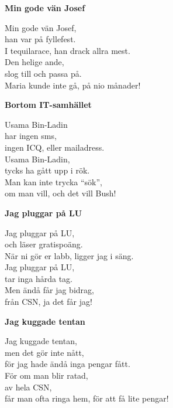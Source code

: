 \documentclass[10pt]{article}
\newenvironment{song}[2]{
	\textbf{#1}\\
	\emph{#2}\par
	\vspace{-1mm}
}{
	\vspace{2mm}
}
\begin{document}
\begin{multicols*}{2}
\vspace*{-0.2\baselineskip}
\begin{song}{Min gode vän Josef}{\vspace*{-1.2\baselineskip}}
	Min gode vän Josef,\\
	han var på fyllefest.\\
	I tequilarace, han drack allra mest.\\
	Den helige ande,\\
	slog till och passa på.\\
	Maria kunde inte gå, på nio månader!
\end{song}

\vspace*{-0.2\baselineskip}
\begin{song}{Bortom IT-samhället}{\vspace*{-1.2\baselineskip}}
	Usama Bin-Ladin\\
	har ingen sms,\\
	ingen ICQ, eller mailadress.\\
	Usama Bin-Ladin,\\
	tycks ha gått upp i rök.\\
	Man kan inte trycka ``sök'',\\
	om man vill, och det vill Bush!
\end{song}

\vspace*{-0.2\baselineskip}
\begin{song}{Jag pluggar på LU}{\vspace*{-1.2\baselineskip}}
	Jag pluggar på LU,\\
	och läser gratispoäng.\\
	När ni gör er labb, ligger jag i säng.\\
	Jag pluggar på LU,\\
	tar inga hårda tag.\\
	Men ändå får jag bidrag,\\
	från CSN, ja det får jag!
\end{song}

\vspace*{-0.2\baselineskip}
\begin{song}{Jag kuggade tentan}{\vspace*{-1.2\baselineskip}}
	Jag kuggade tentan,\\
	men det gör inte nått,\\
	för jag hade ändå inga pengar fått.\\
	För om man blir ratad,\\
	av hela CSN,\\
	får man ofta ringa hem, för att få lite pengar!
\end{song}


\end{multicols*}
\end{document}
